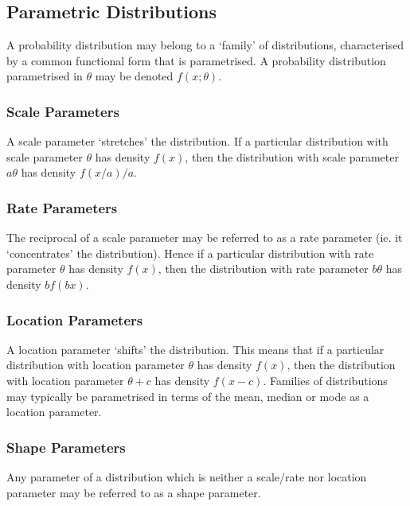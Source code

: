 \documentclass[11pt]{report} %
\begin{document}
\subsection{Parametric Distributions}

A probability distribution may belong to a `family' of distributions, characterised by a common functional form that is parametrised. A probability distribution parametrised in $\theta$ may be denoted $f\left(x; \theta\right)$.

\subsubsection{Scale Parameters}

A scale parameter `stretches' the distribution. If a particular distribution with scale parameter $\theta$ has density $f\left(x\right)$, then the distribution with scale parameter $a\theta$ has density $f\left(x/a\right)/a$.

\subsubsection{Rate Parameters}

The reciprocal of a scale parameter may be referred to as a rate parameter (ie. it `concentrates' the distribution). Hence if a particular distribution with rate parameter $\theta$ has density $f\left(x\right)$, then the distribution with rate parameter $b\theta$ has density $bf\left(bx\right)$.

\subsubsection{Location Parameters}

A location parameter `shifts' the distribution. This means that if a particular distribution with location parameter $\theta$ has density $f\left(x\right)$, then the distribution with location parameter $\theta + c$ has density $f\left(x - c\right)$. Families of distributions may typically be parametrised in terms of the mean, median or mode as a location parameter. 

\subsubsection{Shape Parameters}

Any parameter of a distribution which is neither a scale/rate nor location parameter may be referred to as a shape parameter.
\end{document}
